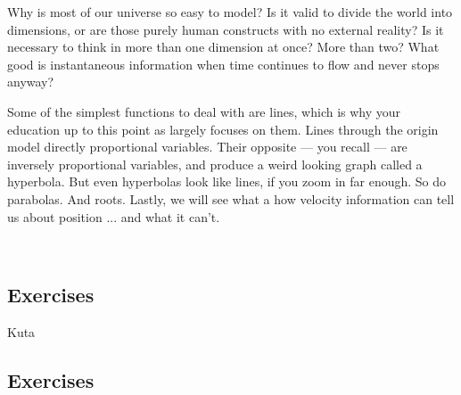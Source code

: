 

Why is most of our universe so easy to model?  
Is it valid to divide the world into dimensions,
or are those purely human constructs with no external reality?  
Is it necessary to think in more 
than one dimension at once?  More than two?  
What good is instantaneous information when 
time continues to flow and never stops anyway?

Some of the simplest functions to deal with are lines, which is why your education
up to this point as largely focuses on them.  Lines through the origin model directly
proportional variables.  Their opposite --- you recall --- are inversely proportional
variables, and produce a weird looking graph called a hyperbola.  But even hyperbolas
look like lines, if you zoom in far enough.  So do parabolas.  And roots.  Lastly,
we will see what a how velocity information can tell us about position ...
and what it can't.

\newpage
\chapterminitoc


\newpage
{}
\newpage

\newpage




\newpage
{}
\newpage

~\vfill
\newpage
\subsection{Exercises}
Kuta





\newpage
{}
\newpage

\subsection{Exercises}
\noindent{}
\newpage
\noindent{}
\newpage
\noindent{}




\newpage
{}
\newpage

~\vfill
